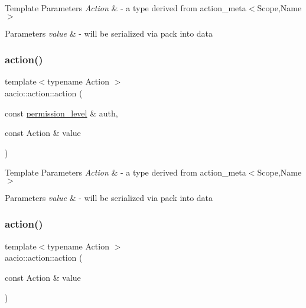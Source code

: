 \begin{DoxyTemplParams}{Template Parameters}
{\em Action} & -\/ a type derived from action\+\_\+meta$<$\+Scope,\+Name$>$ \\
\hline
\end{DoxyTemplParams}

\begin{DoxyParams}{Parameters}
{\em value} & -\/ will be serialized via pack into data \\
\hline
\end{DoxyParams}
\mbox{\label{structaacio_1_1action_ab91b6ad4408160b65753305edef44bcf}} 
\subsubsection{\texorpdfstring{action()}{action()}\hspace{0.1cm}{\footnotesize\ttfamily [2/4]}}
{\footnotesize\ttfamily template$<$typename Action $>$ \\
aacio\+::action\+::action (\begin{DoxyParamCaption}\item[{const \mbox{\hyperlink{structaacio_1_1permission__level}{permission\+\_\+level}} \&}]{auth,  }\item[{const Action \&}]{value }\end{DoxyParamCaption})\hspace{0.3cm}{\ttfamily [inline]}}


\begin{DoxyTemplParams}{Template Parameters}
{\em Action} & -\/ a type derived from action\+\_\+meta$<$\+Scope,\+Name$>$ \\
\hline
\end{DoxyTemplParams}

\begin{DoxyParams}{Parameters}
{\em value} & -\/ will be serialized via pack into data \\
\hline
\end{DoxyParams}
\mbox{\label{structaacio_1_1action_ac0bc0e57e62d1ee6411db792b01d4944}} 
\subsubsection{\texorpdfstring{action()}{action()}\hspace{0.1cm}{\footnotesize\ttfamily [3/4]}}
{\footnotesize\ttfamily template$<$typename Action $>$ \\
aacio\+::action\+::action (\begin{DoxyParamCaption}\item[{const Action \&}]{value }\end{DoxyParamCaption})\hspace{0.3cm}{\ttfamily [inline]}}


